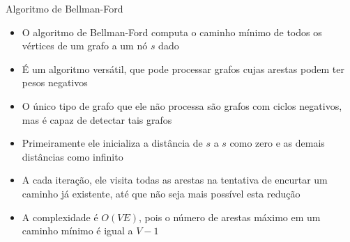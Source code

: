 \begin{frame}[fragile]{Algoritmo de Bellman-Ford}

    \begin{itemize}
        \item O algoritmo de Bellman-Ford computa o caminho mínimo de todos os vértices de
            um grafo a um nó $s$ dado

        \item É um algoritmo versátil, que pode processar grafos cujas arestas podem ter pesos
            negativos

        \item O único tipo de grafo que ele não processa são grafos com ciclos negativos,
            mas é capaz de detectar tais grafos

        \item Primeiramente ele inicializa a distância de $s$ a $s$ como zero e as demais 
            distâncias como  infinito 

        \item A cada iteração, ele visita todas as arestas na tentativa de encurtar um
            caminho já existente, até que não seja mais possível esta redução

        \item A complexidade é $O(VE)$, pois o número de arestas máximo em um caminho mínimo é
            igual a $V - 1$
    \end{itemize}

\end{frame}

